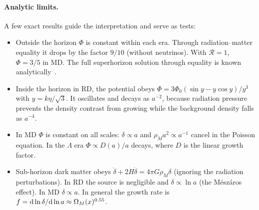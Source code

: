 \paragraph*{Analytic limits.} A few exact results guide the interpretation and serve as tests:
\begin{itemize}
\item Outside the horizon $\Phi$ is constant within each era. Through radiation--matter equality it drops by the factor
      $9/10$ (without neutrinos). With $\mathcal{R}=1$, $\Phi=3/5$ in MD. The full superhorizon solution through
      equality is known analytically~\cite{Kodama1984}.
\item Inside the horizon in RD, the potential obeys $\Phi=3\Phi_0(\sin y-y\cos y)/y^3$ with $y=k\eta/\sqrt3$. It
      oscillates and decays as $a^{-2}$, because radiation pressure prevents the density contrast from growing while
      the background density falls as $a^{-4}$.
\item In MD $\Phi$ is constant on all scales: $\delta\propto a$ and $\rho_Ma^2\propto a^{-1}$ cancel in the Poisson
      equation. In the $\Lambda$ era $\Phi\propto D(a)/a$ decays, where $D$ is the linear growth factor.
\item Sub-horizon dark matter obeys $\ddot\delta+2H\dot\delta=4\pi G\rho_M\delta$ (ignoring the radiation
      perturbations). In RD the source is negligible and $\delta\propto\ln a$ (the M\'esz\'aros effect). In MD
      $\delta\propto a$. In general the growth rate is $f=\mathrm{d}\ln\delta/\mathrm{d}\ln a\approx\Omega_M(x)^{0.55}$.
\end{itemize}

